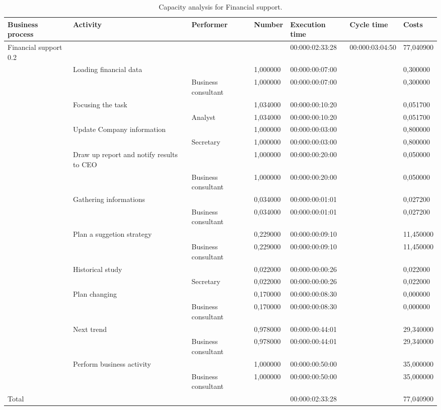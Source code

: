 \begin{landscape}
\centering
\begin{table}
{\tiny
\begin{tabular}{|l|l|l|l|l|l|l|}
Business process&Activity&Performer&Number&Execution time&Cycle time&Costs\\
\hline
Financial support 0.2&&&&00:000:02:33:28&00:000:03:04:50&77,040900\\
\hline
&Loading financial data&&1,000000&00:000:00:07:00&&0,300000\\
\hline
&&Business consultant&1,000000&00:000:00:07:00&&0,300000\\
\hline
&Focusing the task&&1,034000&00:000:00:10:20&&0,051700\\
\hline
&&Analyst&1,034000&00:000:00:10:20&&0,051700\\
\hline
&Update Company information&&1,000000&00:000:00:03:00&&0,800000\\
\hline
&&Secretary&1,000000&00:000:00:03:00&&0,800000\\
\hline
&Draw up report and notify results to CEO&&1,000000&00:000:00:20:00&&0,050000\\
\hline
&&Business consultant&1,000000&00:000:00:20:00&&0,050000\\
\hline
&Gathering informations&&0,034000&00:000:00:01:01&&0,027200\\
\hline
&&Business consultant&0,034000&00:000:00:01:01&&0,027200\\
\hline
&Plan a suggetion strategy&&0,229000&00:000:00:09:10&&11,450000\\
\hline
&&Business consultant&0,229000&00:000:00:09:10&&11,450000\\
\hline
&Historical study&&0,022000&00:000:00:00:26&&0,022000\\
\hline
&&Secretary&0,022000&00:000:00:00:26&&0,022000\\
\hline
&Plan changing&&0,170000&00:000:00:08:30&&0,000000\\
\hline
&&Business consultant&0,170000&00:000:00:08:30&&0,000000\\
\hline
&Next trend&&0,978000&00:000:00:44:01&&29,340000\\
\hline
&&Business consultant&0,978000&00:000:00:44:01&&29,340000\\
\hline
&Perform business activity&&1,000000&00:000:00:50:00&&35,000000\\
\hline
&&Business consultant&1,000000&00:000:00:50:00&&35,000000\\
\hline
Total&&&&00:000:02:33:28&&77,040900
\end{tabular}
}
\caption{Capacity analysis for Financial support.}
\end{table}
\end{landscape}
%

